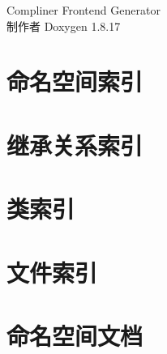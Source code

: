 \let\mypdfximage\pdfximage\def\pdfximage{\immediate\mypdfximage}\documentclass[twoside]{book}
\newcommand{\+}{\discretionary{\mbox{\scriptsize$\hookleftarrow$}}{}{}}
\newcommand{\clearemptydoublepage}{%
  \newpage{\pagestyle{empty}\cleardoublepage}%
}
\begin{document}
\begin{CJK}{UTF8}{min}

\hypersetup{pageanchor=false,
             bookmarksnumbered=true,
             pdfencoding=unicode
            }
\begin{titlepage}
\vspace*{7cm}
\begin{center}%
{\Large Compliner Frontend Generator }\\
\vspace*{1cm}
{\large 制作者 Doxygen 1.8.17}\\
\end{center}
\end{titlepage}
\clearemptydoublepage
{}
\tableofcontents
\clearemptydoublepage
{}
\hypersetup{pageanchor=true}

\chapter{命名空间索引}

\chapter{继承关系索引}

\chapter{类索引}

\chapter{文件索引}

\chapter{命名空间文档}

















\end{CJK}
\end{document}
